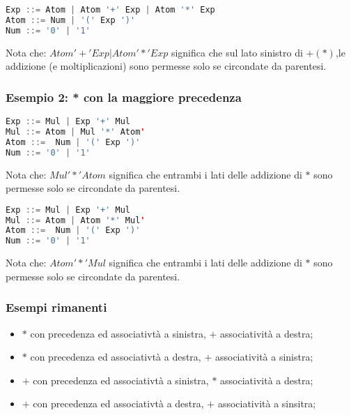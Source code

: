 \begin{lstlisting}[language=Java, caption={Associatività a destra non ambigua}]
Exp ::= Atom | Atom '+' Exp | Atom '*' Exp
Atom ::= Num | '(' Exp ')'
Num ::= '0' | '1'
\end{lstlisting}
Nota che: $Atom '+' Exp | Atom '*' Exp$ significa che sul lato sinistro di 
$+(*)$,le addizione (e moltiplicazioni) sono permesse solo se circondate da
parentesi.
\begin{figure}[H]
  \centering
\end{figure}

\subsubsection{Esempio 2: * con la maggiore precedenza}
\begin{lstlisting}[language=Java, caption={Associative a sinistra non ambigue}]
Exp ::= Mul | Exp '+' Mul
Mul ::= Atom | Mul '*' Atom'
Atom ::=  Num | '(' Exp ')'
Num ::= '0' | '1'
\end{lstlisting}
Nota che: $Mul '*' Atom $ significa che entrambi i lati delle addizione di $*$
sono permesse solo se circondate da parentesi.

\begin{lstlisting}[language=Java, caption={Associative a destra non ambigue}]
Exp ::= Mul | Exp '+' Mul
Mul ::= Atom | Atom '*' Mul'
Atom ::=  Num | '(' Exp ')'
Num ::= '0' | '1'
\end{lstlisting}
Nota che: $Atom '*' Mul $ significa che entrambi i lati delle addizione di $*$
sono permesse solo se circondate da parentesi.

\subsubsection{Esempi rimanenti}
\begin{itemize}
  \item $*$ con precedenza ed associativtà  a sinistra, $+$ associatività a
    destra;
  \item $*$ con precedenza ed associativtà  a destra, $+$ associatività a
    sinistra;
  \item $+$ con precedenza ed associativtà  a sinistra, $*$ associatività a
    destra;
  \item $+$ con precedenza ed associativtà  a destra, $+$ associatività a
    sinsitra;
\end{itemize}

